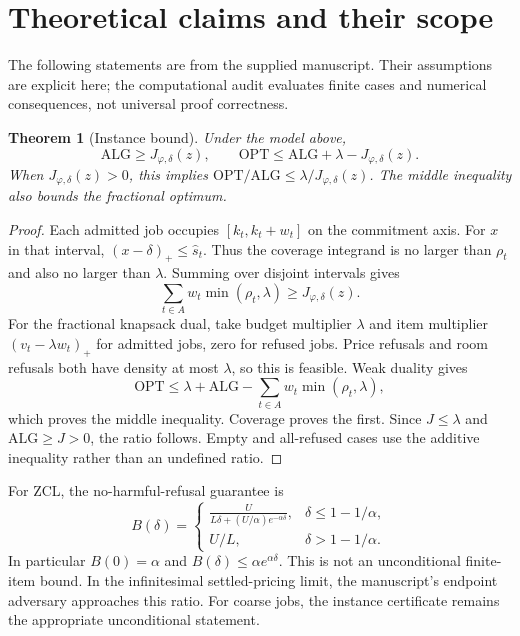 \documentclass[11pt]{article}
\newtheorem{theorem}{Theorem}\newtheorem{proposition}{Proposition}
\newcommand{\ALG}{\mathrm{ALG}}\newcommand{\OPT}{\mathrm{OPT}}
\begin{document}
\section{Theoretical claims and their scope}
The following statements are from the supplied manuscript. Their assumptions are explicit here; the computational audit evaluates finite cases and numerical consequences, not universal proof correctness.

\begin{theorem}[Instance bound]
Under the model above,
\[\ALG\ge J_{\varphi,\delta}(z),\qquad
\OPT\le\ALG+\lambda-J_{\varphi,\delta}(z).\]
When $J_{\varphi,\delta}(z)>0$, this implies $\OPT/\ALG\le\lambda/J_{\varphi,\delta}(z)$. The middle inequality also bounds the fractional optimum.
\end{theorem}
\begin{proof}
Each admitted job occupies $[k_t,k_t+w_t]$ on the commitment axis. For $x$ in that interval, $(x-\delta)_+\le\widehat s_t$. Thus the coverage integrand is no larger than $\rho_t$ and also no larger than $\lambda$. Summing over disjoint intervals gives
\[\sum_{t\in A}w_t\min(\rho_t,\lambda)\ge J_{\varphi,\delta}(z).\]
For the fractional knapsack dual, take budget multiplier $\lambda$ and item multiplier $(v_t-\lambda w_t)_+$ for admitted jobs, zero for refused jobs. Price refusals and room refusals both have density at most $\lambda$, so this is feasible. Weak duality gives
\[\OPT\le\lambda+\ALG-\sum_{t\in A}w_t\min(\rho_t,\lambda),\]
which proves the middle inequality. Coverage proves the first. Since $J\le\lambda$ and $\ALG\ge J>0$, the ratio follows. Empty and all-refused cases use the additive inequality rather than an undefined ratio.
\end{proof}

For ZCL, the no-harmful-refusal guarantee is
\[ B(\delta)=\begin{cases}
\displaystyle\frac{U}{L\delta+(U/\alpha)e^{-\alpha\delta}},&\delta\le1-1/\alpha,\\
U/L,&\delta>1-1/\alpha.
\end{cases}\]
In particular $B(0)=\alpha$ and $B(\delta)\le\alpha e^{\alpha\delta}$. This is not an unconditional finite-item bound. In the infinitesimal settled-pricing limit, the manuscript's endpoint adversary approaches this ratio. For coarse jobs, the instance certificate remains the appropriate unconditional statement.
\end{document}
